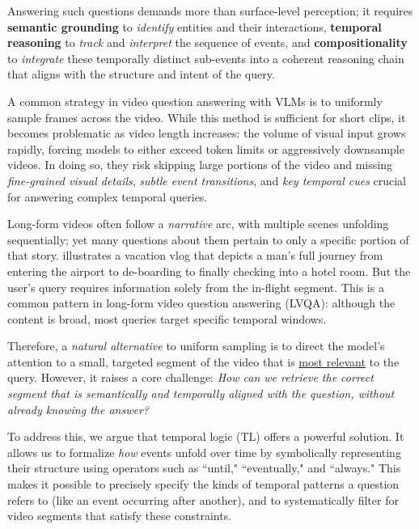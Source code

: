\documentclass[letterpaper]{article} %
\begin{document}
    Answering such questions demands more than surface-level perception; it requires  \textbf{semantic grounding} to \textit{identify} entities and their interactions,  \textbf{temporal reasoning} to \textit{track} and \textit{interpret} the sequence of events, and  \textbf{compositionality} to \textit{integrate} these temporally distinct sub-events into a coherent reasoning chain
    that aligns with the structure and intent of the query.

    A common strategy in video question answering with VLMs is to uniformly sample frames across the video. While this method is sufficient for short clips, it becomes problematic as video length increases: the volume of visual input grows rapidly, forcing models to either exceed token limits or aggressively downsample videos. In doing so, they risk skipping large portions of the video and missing \textit{fine-grained visual details}, \textit{subtle event transitions}, and \textit{key temporal cues} crucial for answering complex temporal queries. 
        
    Long-form videos often follow a \textit{narrative} arc, with multiple scenes unfolding sequentially; yet many questions about them pertain to only a specific portion of that story.  illustrates a vacation vlog that depicts a man's full journey from entering the airport to de-boarding to finally checking into a hotel room. But the user's query requires information solely from the in-flight segment. This is a common pattern in long-form video question answering (LVQA): although the content is broad, most queries target specific temporal windows.
    
    Therefore, a \textit{natural alternative} to uniform sampling is to direct the model's attention to a small, targeted segment of the video that is \underline{most relevant} to the query. However, it raises a core challenge: \textit{How can we retrieve the correct segment that is semantically and temporally aligned with the question, without already knowing the answer?}
        
    To address this, we argue that temporal logic (TL) offers a powerful solution. It allows us to formalize \textit{how} events unfold over time by symbolically representing their structure using operators such as ``until," ``eventually," and ``always." This makes it possible to precisely specify the kinds of temporal patterns a question refers to (like an event occurring after another), and to systematically filter for video segments that satisfy these constraints. 
    
\end{document}
